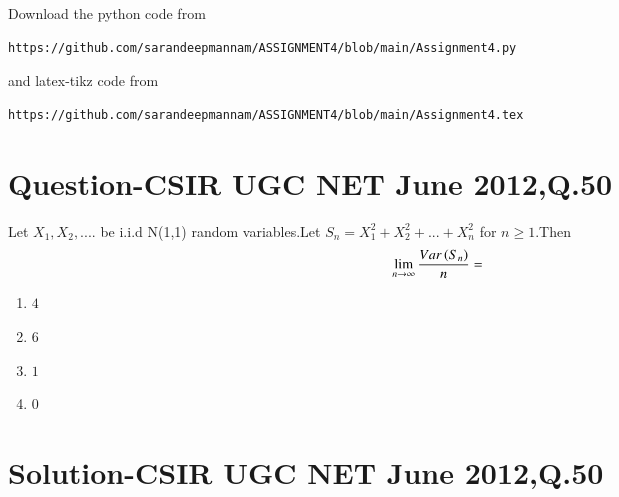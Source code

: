 \documentclass[journal,12pt,twocolumn]{IEEEtran}
\begin{document}
Download the python code from 
\begin{lstlisting}
https://github.com/sarandeepmannam/ASSIGNMENT4/blob/main/Assignment4.py
\end{lstlisting}
%
and latex-tikz code from 
%
\begin{lstlisting}
https://github.com/sarandeepmannam/ASSIGNMENT4/blob/main/Assignment4.tex
\end{lstlisting}
\section{Question-CSIR UGC NET June 2012,Q.50}
Let $X_{1},X_{2},....$ be i.i.d N(1,1) random variables.Let $S_{n}=X_{1}^{2}+X_{2}^2+...+X_{n}^{2}$ for $n\ge1$.Then $$\lim_{n \to \infty}{\frac{Var\left(S_{n}\right)}{n}}=$$
\begin{enumerate}[label = (\Alph*)]
\item  $4$
\item  $6$
\item  $1$
\item  $0$
\end{enumerate}

\section{Solution-CSIR UGC NET June 2012,Q.50}
\end{document}
